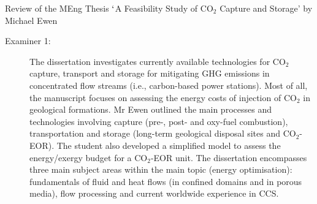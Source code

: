 \documentclass[14pt,twoside]{report}
\begin{document}
\bigskip

\begin{center}  
  {\Large Review of the MEng Thesis $\lq$A Feasibility Study of CO$_{2}$ Capture and Storage' by Michael Ewen}
\end{center}

\begin{description}

\item[Examiner 1:] The dissertation investigates currently available technologies for CO$_{2}$ capture, transport and storage for mitigating GHG emissions in concentrated flow streams (i.e., carbon-based power stations). Most of all, the manuscript focuses on assessing the energy costs of injection of CO$_{2}$ in geological formations. Mr Ewen outlined the main processes and technologies involving capture (pre-, post- and oxy-fuel combustion), transportation and storage (long-term geological disposal sites and CO$_{2}$-EOR). The student also developed a simplified model to assess the energy/exergy budget for a CO$_{2}$-EOR unit. The dissertation encompasses three main subject areas within the main topic (energy optimisation): fundamentals of fluid and heat flows (in confined domains and in porous media), flow processing and current worldwide experience in CCS. 


\end{description}
\end{document}
